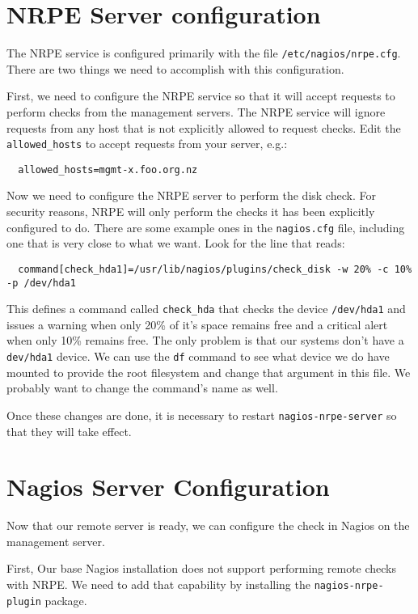 \documentclass{article}   	%
\begin{document}
\section{NRPE Server configuration}
The NRPE service is configured primarily with the file \texttt{/etc/nagios/nrpe.cfg}. There are two things we need to accomplish with this configuration.

First, we need to configure the NRPE service so that it will accept requests to perform checks from the management servers. The NRPE service will ignore requests from any host that is not explicitly allowed to request checks. Edit the \texttt{allowed\_hosts} to accept requests from your server, e.g.:

\begin{verbatim}
  allowed_hosts=mgmt-x.foo.org.nz
\end{verbatim}

Now we need to configure the NRPE server to perform the disk check. For security reasons, NRPE will only perform the checks it has been explicitly configured to do. There are some example ones in the \texttt{nagios.cfg} file, including one that is very close to what we want. Look for the line that reads:

\begin{verbatim}
  command[check_hda1]=/usr/lib/nagios/plugins/check_disk -w 20% -c 10% -p /dev/hda1
\end{verbatim}

This defines a command called \texttt{check\_hda} that checks the device \texttt{/dev/hda1} and issues a warning when only 20\% of it's space remains free and a critical alert when only 10\% remains free. The only problem is that our systems don't have a \texttt{dev/hda1} device. We can use the \texttt{df} command to see what device we do have mounted to provide the root filesystem and change that argument in this file. We probably want to change the command's name as well.

Once these changes are done, it is necessary to restart \texttt{nagios-nrpe-server} so that they will take effect.



\section{Nagios Server Configuration}
Now that our remote server is ready, we can configure the check in Nagios on the management server.

First, Our base Nagios installation does not support performing remote checks with NRPE. We need to add that capability by installing the \texttt{nagios-nrpe-plugin} package.
\end{document}
